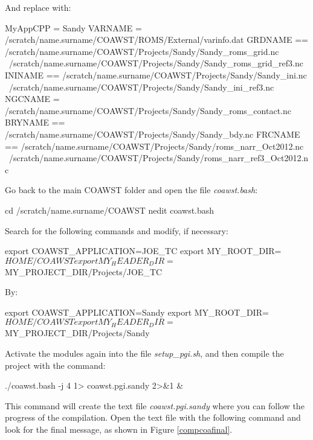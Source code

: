 \noindent And replace with:
\bigskip

\begin{bashcode}[fontsize=\footnotesize]
MyAppCPP = Sandy
VARNAME  = /scratch/name.surname/COAWST/ROMS/External/varinfo.dat
GRDNAME == /scratch/name.surname/COAWST/Projects/Sandy/Sandy_roms_grid.nc \
           /scratch/name.surname/COAWST/Projects/Sandy/Sandy_roms_grid_ref3.nc
ININAME == /scratch/name.surname/COAWST/Projects/Sandy/Sandy_ini.nc \
           /scratch/name.surname/COAWST/Projects/Sandy/Sandy_ini_ref3.nc
NGCNAME =  /scratch/name.surname/COAWST/Projects/Sandy/Sandy_roms_contact.nc
BRYNAME == /scratch/name.surname/COAWST/Projects/Sandy/Sandy_bdy.nc
FRCNAME == /scratch/name.surname/COAWST/Projects/Sandy/roms_narr_Oct2012.nc \
           /scratch/name.surname/COAWST/Projects/Sandy/roms_narr_ref3_Oct2012.nc
\end{bashcode}
\bigskip

\noindent Go back to the main COAWST folder and open the file \textit{coawst.bash}:
\bigskip

\begin{bashcode}
cd /scratch/name.surname/COAWST
nedit coawst.bash
\end{bashcode}
\bigskip

\noindent Search for the following commands and modify, if necessary:
\bigskip

\begin{bashcode}
export   COAWST_APPLICATION=JOE_TC
export   MY_ROOT_DIR=${HOME}/COAWST
export   MY_HEADER_DIR=${MY_PROJECT_DIR}/Projects/JOE_TC
\end{bashcode}
\bigskip

\noindent By:
\bigskip

\begin{bashcode}
export   COAWST_APPLICATION=Sandy
export   MY_ROOT_DIR=${HOME}/COAWST
export   MY_HEADER_DIR=${MY_PROJECT_DIR}/Projects/Sandy
\end{bashcode}
\bigskip

\noindent Activate the modules again into the file \textit{setup\_pgi.sh}, and then compile the project with the command:
\bigskip

\begin{bashcode}
./coawst.bash -j 4  1> coawst.pgi.sandy 2>&1 &
\end{bashcode}
\bigskip

\noindent This command will create the text file \textit{coawst.pgi.sandy} where you can follow the progress of the compilation. Open the text file with the following 
command and look for the final message, as shown in Figure \textcolor{bleu_cite}{\ref{compcoafinal}}.
\bigskip

